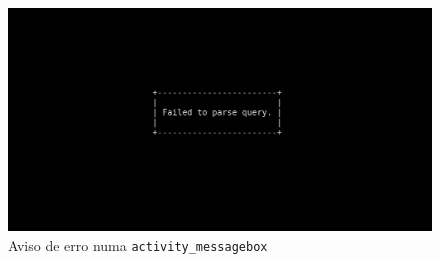 \documentclass[12pt, a4paper]{article}
\begin{document}
\begin{figure}[ht]
    \centering
    \includegraphics[scale=0.25]{res-fase2/interactive_screenshots/messagebox.png}
    \caption{Aviso de erro numa \texttt{activity\_messagebox}}
    \label{fig:messagebox}
\end{figure}
\end{document}
